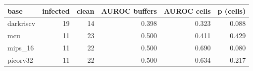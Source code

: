 \begin{tabular}{lrrrrr}
\hline
base & infected & clean & AUROC buffers & AUROC cells & p (cells) \\
\hline
darkriscv & 19 & 14 & 0.398 & 0.323 & 0.088 \\
mcu & 11 & 23 & 0.500 & 0.411 & 0.429 \\
mips\_16 & 11 & 22 & 0.500 & 0.690 & 0.080 \\
picorv32 & 11 & 22 & 0.500 & 0.634 & 0.217 \\
\hline
\end{tabular}
